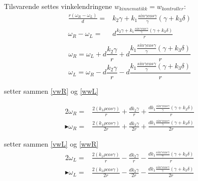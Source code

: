 Tilsvarende settes vinkelendringene $w_{kinnematikk} = w_{kontroller}$:
\begin{equation}
\begin{array}{rl}
\frac{r(\omega_R - \omega_L)}{d} = &k_2 \gamma + k_1 \frac{sin\gamma cos\gamma}{\gamma}(\gamma+k_3 \delta)\\

\omega_R - \omega_L = & d\frac{ k_2 \gamma + k_1 \frac{sin\gamma cos\gamma}{\gamma}(\gamma+k_3 \delta)}{r}\\



\end{array}
\end{equation}
\begin{equation}
\omega_R  = \omega_L + d\frac{ k_2 \gamma}{r} + d\frac{k_1 \frac{sin\gamma cos\gamma}{\gamma}(\gamma+k_3 \delta)}{r} 
\label{wwR}
\end{equation}
\begin{equation}
\omega_L  = \omega_R - d\frac{ k_2 \gamma}{r} - d\frac{k_1 \frac{sin\gamma cos\gamma}{\gamma}(\gamma+k_3 \delta)}{r}
\label{wwL}
\end{equation}

setter sammen \ref{vwR} og \ref{wwL}

\begin{equation}
\begin{array}{rl}
2 \omega_R  =& \frac{2(k_1 \rho cos\gamma)}{r} + \frac{d k_2 \gamma}{r} + \frac{d k_1 \frac{sin\gamma cos\gamma}{\gamma}(\gamma+k_3 \delta)}{r} \\
\blacktriangleright \omega_R  =& \frac{2(k_1 \rho cos\gamma)}{2r} + \frac{d k_2 \gamma}{2r} + \frac{d k_1 \frac{sin\gamma cos\gamma}{\gamma}(\gamma+k_3 \delta)}{2r}
\end{array}
\label{wR}
\end{equation}

setter sammen \ref{vwL} og \ref{wwR}
\begin{equation}
\begin{array}{rl}
2\omega_L  =& \frac{2(k_1 \rho cos\gamma)}{r} - \frac{d k_2 \gamma}{r} - \frac{d k_1 \frac{sin\gamma cos\gamma}{\gamma}(\gamma+k_3 \delta)}{r}\\
\blacktriangleright \omega_L  =& \frac{2(k_1 \rho cos\gamma)}{2r} - \frac{d k_2 \gamma}{2r} - \frac{d k_1 \frac{sin\gamma cos\gamma}{\gamma}(\gamma+k_3 \delta)}{2r}
\end{array}
\label{wL}
\end{equation}

